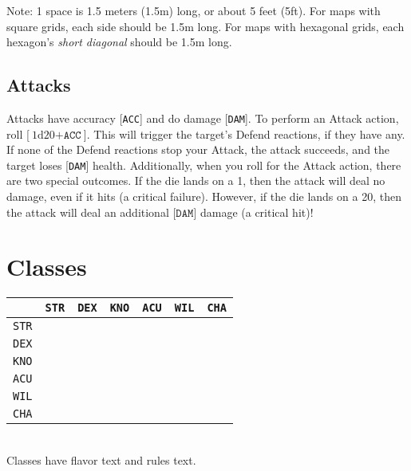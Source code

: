 \documentclass[12pt]{article}
\newcommand{\STR}{\texttt{STR}}
\newcommand{\DEX}{\texttt{DEX}}
\newcommand{\KNO}{\texttt{KNO}}
\newcommand{\ACU}{\texttt{ACU}}
\newcommand{\WIL}{\texttt{WIL}}
\newcommand{\CHA}{\texttt{CHA}}
\newcommand{\ACC}{\texttt{ACC}}
\newcommand{\DAM}{\texttt{DAM}}
\newcommand{\dice}[2]{\text{#1d#2}}
\begin{document}
Note: 1 space is 1.5 meters (1.5m) long, or about 5 feet (5ft). For maps with square grids, each side should be 1.5m long. For maps with hexagonal grids, each hexagon’s \textit{short diagonal} should be 1.5m long.

\subsection{Attacks}

Attacks have accuracy [\ACC] and do damage [\DAM]. To perform an Attack action, roll [$\dice{1}{20} + \ACC$]. This will trigger the target’s Defend reactions, if they have any. If none of the Defend reactions stop your Attack, the attack succeeds, and the target loses [\DAM] health. Additionally, when you roll for the Attack action, there are two special outcomes. If the die lands on a 1, then the attack will deal no damage, even if it hits (a critical failure). However, if the die lands on a 20, then the attack will deal an additional [$\DAM$] damage (a critical hit)!

\pagebreak
\section{Classes}

\begin{tabularx}{\textwidth}{c|CCCCCC}
& \STR & \DEX & \KNO & \ACU & \WIL & \CHA \\\hline
\STR &  &  &  &  &  &  \\
\DEX &  &  &  &  &  &  \\
\KNO &  &  &  &  &  &  \\
\ACU &  &  &  &  &  &   \\
\WIL &  &  &  &  &  &  \\
\CHA &  &  &  &  &  &  \\
\end{tabularx}
\\[5mm]
Classes have flavor text and rules text.
\end{document}
